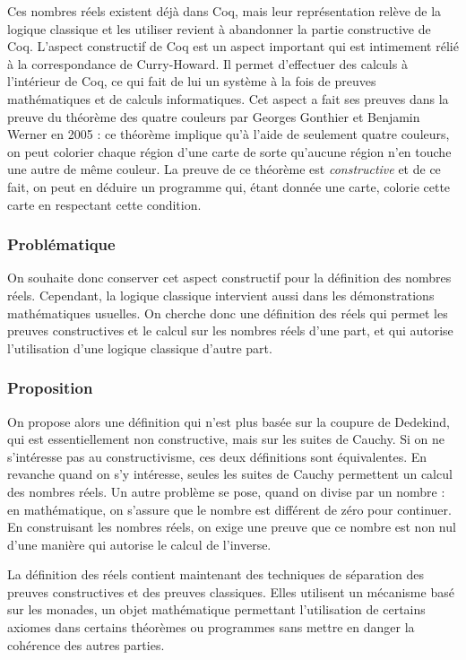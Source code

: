 \documentclass[11pt]{article}
\begin{document}
Ces nombres réels existent déjà dans Coq, mais leur représentation relève de la logique classique et les utiliser revient à abandonner la partie constructive de Coq. L'aspect constructif de Coq est un aspect important qui est intimement rélié à la correspondance de Curry-Howard. Il permet d'effectuer des calculs à l'intérieur de Coq, ce qui fait de lui un système à la fois de preuves mathématiques et de calculs informatiques. Cet aspect a fait ses preuves dans la preuve du théorème des quatre couleurs par Georges Gonthier et Benjamin Werner en 2005 : ce théorème implique qu'à l'aide de seulement quatre couleurs, on peut colorier chaque région d'une carte de sorte qu'aucune région n'en touche une autre de même couleur. La preuve de ce théorème est \emph{constructive} et de ce fait, on peut en déduire un programme qui, étant donnée une carte, colorie cette carte en respectant cette condition.

\subsubsection{Problématique}

On souhaite donc conserver cet aspect constructif pour la définition des nombres réels. Cependant, la logique classique intervient aussi dans les démonstrations mathématiques usuelles. On cherche donc une définition des réels qui permet les preuves constructives et le calcul sur les nombres réels d'une part, et qui autorise l'utilisation d'une logique classique d'autre part.

\subsubsection{Proposition}

On propose alors une définition qui n'est plus basée sur la coupure de Dedekind, qui est essentiellement non constructive, mais sur les suites de Cauchy. Si on ne s'intéresse pas au constructivisme, ces deux définitions sont équivalentes. En revanche quand on s'y intéresse, seules les suites de Cauchy permettent un calcul des nombres réels. Un autre problème se pose, quand on divise par un nombre : en mathématique, on s'assure que le nombre est différent de zéro pour continuer. En construisant les nombres réels, on exige une preuve que ce nombre est non nul d'une manière qui autorise le calcul de l'inverse.

La définition des réels contient maintenant des techniques de séparation des preuves constructives et des preuves classiques. Elles utilisent un mécanisme basé sur les monades, un objet mathématique permettant l'utilisation de certains axiomes dans certains théorèmes ou programmes sans mettre en danger la cohérence des autres parties.
\end{document}

